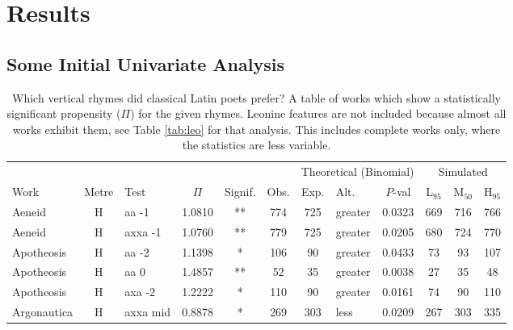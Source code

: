 \documentclass[twocolumn, switch]{article} %
\begin{document}
\section{Results}
\label{sec:results}

\subsection{Some Initial Univariate Analysis}

\begin{table}[h!]
\caption{
  Which vertical rhymes did classical Latin poets prefer? A table of works which
  show a statistically significant propensity ($\Pi$) for the given rhymes.
  Leonine features are not included because almost all works exhibit them, see
  Table \ref{tab:leo} for that analysis. This includes complete works only,
  where the statistics are less variable.
}
\label{tab:allbutleo}
\par\medskip
\centering
\begin{adjustbox}{totalheight=0.9\textheight}
  \begin{tabular}{lclcccclcc@{\hspace{1\tabcolsep}}c@{\hspace{1\tabcolsep}}c}
  \toprule
          &&&&&&\multicolumn{3}{c}{Theoretical (Binomial)}&\multicolumn{3}{c}{Simulated}\\\cmidrule(lr{2pt}){7-9}\cmidrule(l{2pt}r){10-12}
          Work & Metre &       Test &    $\Pi$ & Signif. &    Obs. &  Exp. & Alt. &  $P$-val & L$_{95}$ &  M$_{50}$ &  H$_{95}$ \\
  \midrule
        Aeneid &     H &     aa -1 & 1.0810 &    ** &   774 &       725 &     greater & 0.0323 &   669 &   716 &   766 \\
        Aeneid &     H &   axxa -1 & 1.0760 &    ** &   779 &       725 &     greater & 0.0205 &   680 &   724 &   770 \\
    Apotheosis &     H &     aa -2 & 1.1398 &     * &   106 &        90 &     greater & 0.0433 &    73 &    93 &   107 \\
    Apotheosis &     H &      aa 0 & 1.4857 &    ** &    52 &        35 &     greater & 0.0038 &    27 &    35 &    48 \\
    Apotheosis &     H &    axa -2 & 1.2222 &     * &   110 &        90 &     greater & 0.0161 &    74 &    90 &   110 \\
   Argonautica &     H &  axxa mid & 0.8878 &     * &   269 &       303 &        less & 0.0209 &   267 &   303 &   335 \\

\end{tabular}
\end{adjustbox}
\end{table}
\end{document}
